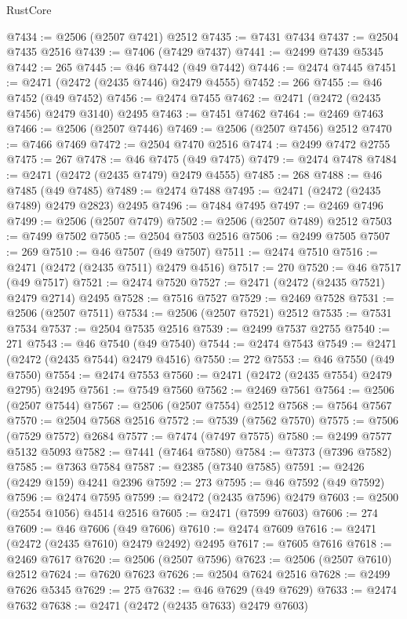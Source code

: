 \begin{lexlean}{RustCore}
\begin{coremodule}
@7434 := @2506 (@2507 @7421) @2512
@7435 := @7431 @7434
@7437 := @2504 @7435 @2516
@7439 := @7406 (@7429 @7437)
@7441 := @2499 @7439 @5345
@7442 := 265
@7445 := @46 @7442 (@49 @7442)
@7446 := @2474 @7445
@7451 := @2471 (@2472 (@2435 @7446) @2479 @4555)
@7452 := 266
@7455 := @46 @7452 (@49 @7452)
@7456 := @2474 @7455
@7462 := @2471 (@2472 (@2435 @7456) @2479 @3140) @2495
@7463 := @7451 @7462
@7464 := @2469 @7463
@7466 := @2506 (@2507 @7446)
@7469 := @2506 (@2507 @7456) @2512
@7470 := @7466 @7469
@7472 := @2504 @7470 @2516
@7474 := @2499 @7472 @2755
@7475 := 267
@7478 := @46 @7475 (@49 @7475)
@7479 := @2474 @7478
@7484 := @2471 (@2472 (@2435 @7479) @2479 @4555)
@7485 := 268
@7488 := @46 @7485 (@49 @7485)
@7489 := @2474 @7488
@7495 := @2471 (@2472 (@2435 @7489) @2479 @2823) @2495
@7496 := @7484 @7495
@7497 := @2469 @7496
@7499 := @2506 (@2507 @7479)
@7502 := @2506 (@2507 @7489) @2512
@7503 := @7499 @7502
@7505 := @2504 @7503 @2516
@7506 := @2499 @7505
@7507 := 269
@7510 := @46 @7507 (@49 @7507)
@7511 := @2474 @7510
@7516 := @2471 (@2472 (@2435 @7511) @2479 @4516)
@7517 := 270
@7520 := @46 @7517 (@49 @7517)
@7521 := @2474 @7520
@7527 := @2471 (@2472 (@2435 @7521) @2479 @2714) @2495
@7528 := @7516 @7527
@7529 := @2469 @7528
@7531 := @2506 (@2507 @7511)
@7534 := @2506 (@2507 @7521) @2512
@7535 := @7531 @7534
@7537 := @2504 @7535 @2516
@7539 := @2499 @7537 @2755
@7540 := 271
@7543 := @46 @7540 (@49 @7540)
@7544 := @2474 @7543
@7549 := @2471 (@2472 (@2435 @7544) @2479 @4516)
@7550 := 272
@7553 := @46 @7550 (@49 @7550)
@7554 := @2474 @7553
@7560 := @2471 (@2472 (@2435 @7554) @2479 @2795) @2495
@7561 := @7549 @7560
@7562 := @2469 @7561
@7564 := @2506 (@2507 @7544)
@7567 := @2506 (@2507 @7554) @2512
@7568 := @7564 @7567
@7570 := @2504 @7568 @2516
@7572 := @7539 (@7562 @7570)
@7575 := @7506 (@7529 @7572) @2684
@7577 := @7474 (@7497 @7575)
@7580 := @2499 @7577 @5132 @5093
@7582 := @7441 (@7464 @7580)
@7584 := @7373 (@7396 @7582)
@7585 := @7363 @7584
@7587 := @2385 (@7340 @7585)
@7591 := @2426 (@2429 @159) @4241 @2396
@7592 := 273
@7595 := @46 @7592 (@49 @7592)
@7596 := @2474 @7595
@7599 := @2472 (@2435 @7596) @2479
@7603 := @2500 (@2554 @1056) @4514 @2516
@7605 := @2471 (@7599 @7603)
@7606 := 274
@7609 := @46 @7606 (@49 @7606)
@7610 := @2474 @7609
@7616 := @2471 (@2472 (@2435 @7610) @2479 @2492) @2495
@7617 := @7605 @7616
@7618 := @2469 @7617
@7620 := @2506 (@2507 @7596)
@7623 := @2506 (@2507 @7610) @2512
@7624 := @7620 @7623
@7626 := @2504 @7624 @2516
@7628 := @2499 @7626 @5345
@7629 := 275
@7632 := @46 @7629 (@49 @7629)
@7633 := @2474 @7632
@7638 := @2471 (@2472 (@2435 @7633) @2479 @7603)

\end{coremodule}
\end{lexlean}
